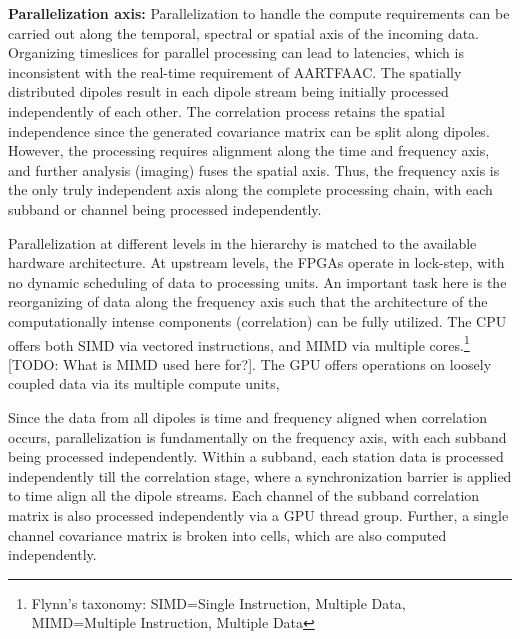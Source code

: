 \documentclass{ws-jai}
\begin{document}

\noindent \textbf  {Parallelization axis:}  Parallelization to handle  the compute
requirements can be carried out along  the temporal, spectral or spatial axis of
the incoming  data.  Organizing timeslices  for parallel processing can  lead to
latencies, which is inconsistent with the real-time requirement of AARTFAAC. The
spatially  distributed dipoles  result  in each  dipole  stream being  initially
processed  independently of  each other.   The correlation  process retains  the
spatial independence  since the generated  covariance matrix can be  split along
dipoles.   However,  the  processing  requires  alignment  along  the  time  and
frequency axis,  and further analysis  (imaging) fuses the spatial  axis.  Thus,
the  frequency axis  is  the  only truly  independent  axis  along the  complete
processing chain, with each subband or channel being processed independently.

Parallelization at different levels in the hierarchy is matched to the available
hardware architecture.  At upstream levels, the FPGAs operate in lock-step, with
no dynamic scheduling of data to processing units. An important task here is the
reorganizing of data along the frequency  axis such that the architecture of the
computationally intense components (correlation) can  be fully utilized. The CPU
offers   both  SIMD   via   vectored  instructions,   and   MIMD  via   multiple
cores.\footnote  {Flynn's  taxonomy:  SIMD=Single  Instruction,  Multiple  Data,
  MIMD=Multiple  Instruction,  Multiple Data}  [TODO:  What  is MIMD  used  here
  for?]. The  GPU offers  operations on  loosely coupled  data via  its multiple
compute units,

Since the data  from all dipoles is time and  frequency aligned when correlation
occurs,  parallelization  is fundamentally  on  the  frequency axis,  with  each
subband being processed  independently.  Within a subband, each  station data is
processed  independently till  the  correlation stage,  where a  synchronization
barrier is applied  to time align all  the dipole streams.  Each  channel of the
subband  correlation matrix  is also  processed independently  via a  GPU thread
group.  Further, a single channel covariance  matrix is broken into cells, which
are also computed independently.\\
\end{document}
